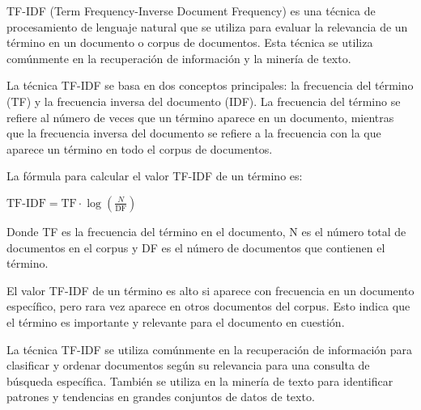 TF-IDF (Term Frequency-Inverse Document Frequency) es una técnica de procesamiento de lenguaje natural que se utiliza para evaluar la relevancia de un término en un documento o corpus de documentos. Esta técnica se utiliza comúnmente en la recuperación de información y la minería de texto.

La técnica TF-IDF se basa en dos conceptos principales: la frecuencia del término (TF) y la frecuencia inversa del documento (IDF). La frecuencia del término se refiere al número de veces que un término aparece en un documento, mientras que la frecuencia inversa del documento se refiere a la frecuencia con la que aparece un término en todo el corpus de documentos.

La fórmula para calcular el valor TF-IDF de un término es:

\(\text{TF-IDF} = \text{TF} \cdot \log\left(\frac{N}{\text{DF}}\right)\)



Donde TF es la frecuencia del término en el documento, N es el número total de documentos en el corpus y DF es el número de documentos que contienen el término.

El valor TF-IDF de un término es alto si aparece con frecuencia en un documento específico, pero rara vez aparece en otros documentos del corpus. Esto indica que el término es importante y relevante para el documento en cuestión.

La técnica TF-IDF se utiliza comúnmente en la recuperación de información para clasificar y ordenar documentos según su relevancia para una consulta de búsqueda específica. También se utiliza en la minería de texto para identificar patrones y tendencias en grandes conjuntos de datos de texto.